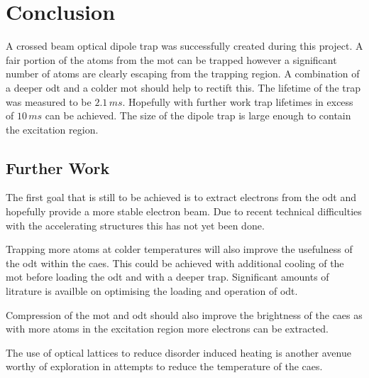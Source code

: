 \chapter{Conclusion}

A crossed beam optical dipole trap was successfully created during this project. A fair portion of the atoms from the \gls{mot} can be trapped however a significant number of atoms are clearly escaping from the trapping region. A combination of a deeper \gls{odt} and a colder \gls{mot} should help to rectift this. The lifetime of the trap was measured to be $2.1\,\unit{ms}$. Hopefully with further work trap lifetimes in excess of $10\,\unit{ms}$ can be achieved. The size of the dipole trap is large enough to contain the excitation region.

\section{Further Work}

The first goal that is still to be achieved is to extract electrons from the \gls{odt} and hopefully provide a more stable electron beam. Due to recent technical difficulties with the accelerating structures this has not yet been done.

Trapping more atoms at colder temperatures will also improve the usefulness of the \gls{odt} within the \gls{caes}. This could be achieved with additional cooling of the \gls{mot} before loading the \gls{odt} and with a deeper trap. Significant amounts of litrature is availble on optimising the loading and operation of \gls{odt}.

Compression of the \gls{mot} and \gls{odt} should also improve the brightness of the \gls{caes} as with more atoms in the excitation region more electrons can be extracted.

The use of optical lattices to reduce disorder induced heating is another avenue worthy of exploration in attempts to reduce the temperature of the \gls{caes}.
